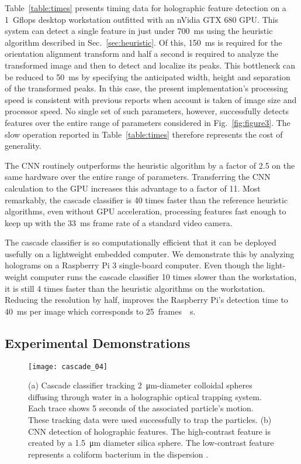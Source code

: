 Table~\ref{table:times} presents timing data for holographic
feature detection on a \SI{1}{Gflops} desktop workstation
outfitted with an
nVidia GTX 680 GPU.
This system can detect a single feature in just under
\SI{700}{\ms} using the heuristic
algorithm described in Sec.~\ref{sec:heuristic}.
Of this, \SI{150}{\ms} is required for the orientation alignment
transform and half a second is required to analyze the
transformed image and then to detect and localize
its peaks.
This bottleneck can be reduced to \SI{50}{\ms} by specifying
the anticipated width, height and separation of the
transformed peaks.
In this case, the present implementation's processing speed
is consistent with previous reports \cite{lee07a,cheong09,allan16trackpy}
when account is taken of image size and processor speed.
No single set of such parameters, however, successfully detects
features over the entire range of parameters considered in
Fig.~\ref{fig:figure3}.
The slow operation reported in Table~\ref{table:times}
therefore represents the cost of generality.

The CNN routinely
outperforms the heuristic algorithm by
a factor of \num{2.5} on the same hardware over the entire
range of parameters.
Transferring the CNN calculation to the GPU
increases this advantage to a factor of \num{11}.
Most remarkably, the cascade classifier is \num{40} times
faster than the reference heuristic algorithms,
even without GPU acceleration, processing features
fast enough to keep up with the \SI{33}{\ms} frame
rate of a standard video camera.

The cascade classifier is so computationally efficient
that it can be deployed usefully on a lightweight
embedded computer. 
We demonstrate this by analyzing holograms on
a Raspberry Pi 3 single-board computer.
Even though the light-weight computer runs the
cascade classifier \num{10} times slower than the
workstation,  it is still \num{4} times faster than the heuristic 
algorithms on the workstation.
Reducing the resolution by half, improves the 
Raspberry Pi's detection time to \SI{40}{\ms} per image 
which corresponds to \SI{25}{frames \per \second}.

\subsection{Experimental Demonstrations}
\label{sec:experiment}

\begin{figure}[!b]
  \centering
  \texttt{[image: cascade\_04]}
  \caption{(a) Cascade classifier tracking \SI{2}{\um}-diameter
    colloidal spheres diffusing through water in a
    holographic optical trapping system.
    Each trace shows 5 seconds of the associated particle's motion.
    These tracking data were used successfully to trap
    the particles.
    (b) CNN detection of holographic features.
    The high-contrast feature is created by a \SI{1.5}{\um}
    diameter silica sphere.  The low-contrast feature
    represents a coliform bacterium in the dispersion \cite{hannel18}.}
  \label{fig:autotrap}
\end{figure}

